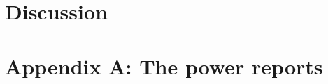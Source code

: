 \documentclass[11pt,a4paper]{article}
\begin{document}
\section{Discussion}
\label{section:discussion}
\section{Appendix A: The power reports}
\label{section:reports}
\end{document}
